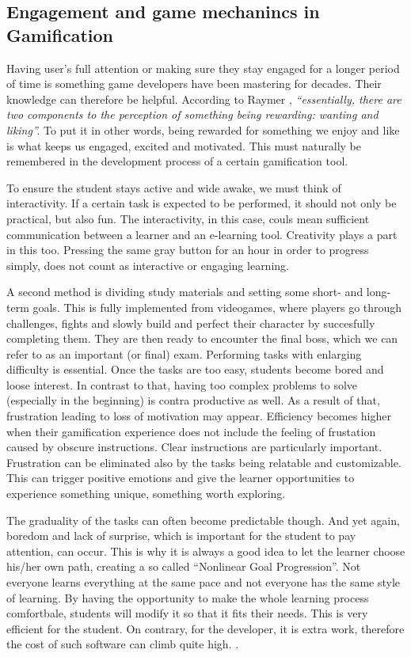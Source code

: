 \documentclass[10pt,english,a4paper]{article}
\begin{document}
\subsection{Engagement and game mechanincs in Gamification} \label{section3.1}
	Having user’s full attention or making sure they stay engaged for a longer period of time is something game developers have been mastering for decades. Their knowledge can therefore be helpful. 
	According to Raymer \cite{Raymer}, \textit{“essentially, there are two components to the perception of something being rewarding: wanting and liking”.} 
	To put it in other words, being rewarded for something we enjoy and like is what keeps us engaged, excited and motivated. 
	This must naturally be remembered in the development process of a certain gamification tool.

	To ensure the student stays active and wide awake, we must think of interactivity. If a certain task is expected to be performed, it should not only be practical, but also fun. 
	The interactivity, in this case, couls mean sufficient communication between a learner and an e-learning tool. Creativity plays a part in this too. Pressing the same gray button for an hour in order to progress simply, does not count as interactive or engaging learning. \cite{ AL-Smadi} 
	
	A second method is dividing study materials and setting some short- and long-term goals. This is fully implemented from videogames, where players go through challenges, fights and slowly build and perfect their character by succesfully completing them.
	They are then ready to encounter the final boss, which we can refer to as an important (or final) exam. 
	Performing tasks with enlarging difficulty is essential. Once the tasks are too easy, students become bored and loose interest. In contrast to that, having too complex problems to solve (especially in the beginning) is contra productive as well. 
	As a result of that, frustration leading to loss of motivation may appear. Efficiency becomes higher when their gamification experience does not include the feeling of frustation caused by obscure instructions. Clear instructions are particularly important. \cite{Raymer} 
	Frustration can be eliminated also by the tasks being relatable and customizable. This can trigger positive emotions and give the learner opportunities to experience something unique, something worth exploring. \cite{ AL-Smadi}
	
	The graduality of the tasks can often become predictable though. And yet again, boredom and lack of surprise, which is important for the student to pay attention, can occur. This is why it is always a good idea to let the learner choose his/her own path, creating a so called “Nonlinear Goal Progression”.
	Not everyone learns everything at the same pace and not everyone has the same style of learning. By having the opportunity to make the whole learning process comfortbale, students will modify it so that it fits their needs. 
	This is very efficient for the student. On contrary, for the developer, it is extra work, therefore the cost of such software can climb quite high. \cite{Raymer}.
\end{document}
